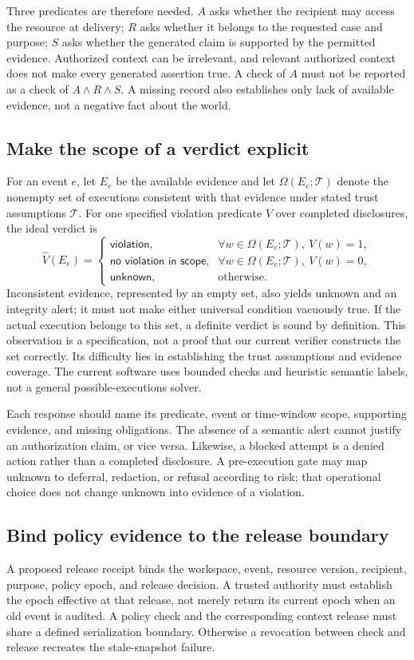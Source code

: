 Three predicates are therefore needed. $A$ asks whether the recipient may access
the resource at delivery; $R$ asks whether it belongs to the requested case and
purpose; $S$ asks whether the generated claim is supported by the permitted
evidence. Authorized context can be irrelevant, and relevant authorized context
does not make every generated assertion true. A check of $A$ must not be reported
as a check of $A\land R\land S$. A missing record also establishes only lack of
available evidence, not a negative fact about the world.

\subsection{Make the scope of a verdict explicit}
For an event $e$, let $E_e$ be the available evidence and let
$\Omega(E_e;\mathcal{T})$ denote the nonempty set of executions consistent with
that evidence under stated trust assumptions $\mathcal{T}$. For one specified
violation predicate $V$ over completed disclosures, the ideal verdict is
\[
\widehat V(E_e)=
\begin{cases}
\textsf{violation}, & \forall w\in\Omega(E_e;\mathcal{T}),\ V(w)=1,\\
\textsf{no violation in scope}, & \forall w\in\Omega(E_e;\mathcal{T}),\ V(w)=0,\\
\textsf{unknown}, & \text{otherwise}.
\end{cases}
\]
Inconsistent evidence, represented by an empty set, also yields unknown and an
integrity alert; it must not make either universal condition vacuously true.
If the actual execution belongs to this set, a definite verdict is sound by
definition. This observation is a specification, not a proof that our current
verifier constructs the set correctly. Its difficulty lies in establishing the
trust assumptions and evidence coverage. The current software uses bounded
checks and heuristic semantic labels, not a general possible-executions solver.

Each response should name its predicate, event or time-window scope, supporting
evidence, and missing obligations. The absence of a semantic alert cannot justify
an authorization claim, or vice versa. Likewise, a blocked attempt is a denied
action rather than a completed disclosure. A pre-execution gate may map unknown
to deferral, redaction, or refusal according to risk; that operational choice
does not change unknown into evidence of a violation.

\subsection{Bind policy evidence to the release boundary}
A proposed release receipt binds the workspace, event, resource version,
recipient, purpose, policy epoch, and release decision. A trusted authority must
establish the epoch effective at that release, not merely return its current
epoch when an old event is audited. A policy check and the corresponding context
release must share a defined serialization boundary. Otherwise a revocation
between check and release recreates the stale-snapshot failure.

